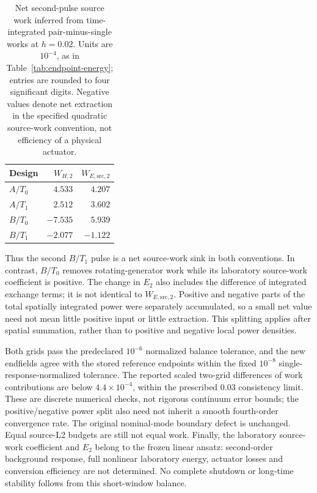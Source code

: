 \begin{table}[htbp]\centering
\caption{Net second-pulse source work inferred from time-integrated
pair-minus-single works at $h=0.02$. Units are $10^{-4}$, as in
Table~\ref{tab:endpoint-energy}; entries are rounded to four significant
digits. Negative values denote net extraction in the specified quadratic
source-work convention, not efficiency of a physical actuator.}
\label{tab:second-pulse-work}
\begin{tabular}{lrr}\toprule
Design&$W_{H,2}$&$W_{E,\mathrm{src},2}$\\\midrule
$A/T_0$&$4.533$&$4.207$\\
$A/T_1$&$2.512$&$3.602$\\
$B/T_0$&$-7.535$&$5.939$\\
$B/T_1$&$-2.077$&$-1.122$\\\bottomrule
\end{tabular}
\end{table}
Thus the second $B/T_1$ pulse is a net source-work sink in both
conventions. In contrast, $B/T_0$ removes rotating-generator work while
its laboratory source-work coefficient is positive. The change in $E_2$
also includes the difference of integrated exchange terms; it is not
identical to $W_{E,\mathrm{src},2}$.
Positive and negative parts of the total spatially integrated power
were separately accumulated, so a small net value need not mean little
positive input or little extraction. This splitting applies after spatial
summation, rather than to positive and negative local power densities.

Both grids pass the predeclared $10^{-6}$ normalized balance tolerance,
and the new endfields agree with the stored reference endpoints within
the fixed $10^{-8}$ single-response-normalized tolerance. The reported
scaled two-grid differences of work contributions are below
$4.4\times10^{-4}$, within the prescribed $0.03$ consistency limit.
These are discrete numerical checks, not rigorous continuum error bounds;
the positive/negative power split also need not inherit a smooth fourth-order
convergence rate. The original nominal-mode boundary defect is unchanged.
Equal source-L2 budgets are still not equal work. Finally, the laboratory
source-work coefficient and $E_2$ belong to the frozen linear ansatz:
second-order background response, full nonlinear laboratory energy,
actuator losses and conversion efficiency are not determined. No complete
shutdown or long-time stability follows from this short-window balance.
